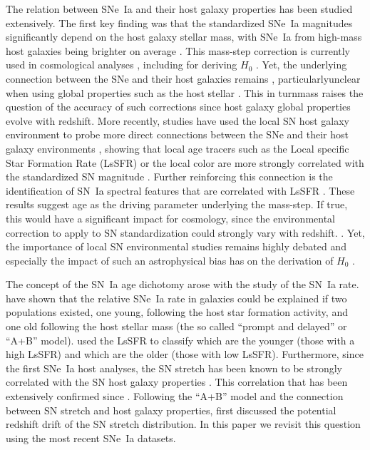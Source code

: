 \documentclass[]{aa}
\begin{document}
The relation between SNe~Ia and their host galaxy properties has been
studied extensively. The first key finding was that the standardized SNe~Ia
magnitudes significantly depend on the host galaxy stellar mass, with
SNe~Ia from high-mass host galaxies being brighter on average
\cite[e.g.][]{kelly2010, sullivan2010, childress2013, betoule2014, rigault2020,
kim19}. This mass-step correction is currently used in cosmological analyses
\citep[e.g.][]{betoule2014, scolnic2018a}, including for deriving $H_0$
\citep{riess2016, riess2019}. Yet, the underlying connection between the SNe and
their host galaxies remains , particularlyunclear when using
global properties such as the host stellar . This in turnmass raises
the question of the accuracy of such corrections since host galaxy
global properties evolve with redshift. More recently, studies have used the
local SN host galaxy environment to probe more direct connections
between the SNe and their host galaxy environments \citep{rigault2013},
showing that local age tracers such as the Local specific Star Formation Rate
(LsSFR) or the local color are more strongly correlated with the standardized SN
magnitude \citep{roman2018, kim18,rigault2020}. Further reinforcing this
connection is the identification of SN~Ia spectral features that are correlated
with LsSFR \citep{nordin2018}. These results suggest age as the driving
parameter underlying the mass-step. If true, this would have a significant
impact for cosmology, since the environmental correction to apply to SN
standardization could strongly vary with redshift. \citep{rigault2013,
childress2014, scolnic2018a}. Yet, the importance of local SN environmental
studies remains highly debated \cite[e.g.][]{jones2015, jones2019} and
especially the impact of such an astrophysical bias has on the derivation of
$H_0$ \citep{jones2015, riess2016, riess2018, rose2019}. 

The concept of the SN~Ia age dichotomy arose with the study of the SN~Ia rate.
\cite{mannucci2005, scannapieco2005, sullivan2006, aubourg2008} have shown that
the relative SNe~Ia rate in galaxies could be explained if two populations
existed, one young, following the host star formation activity, and one old
following the host stellar mass (the so called ``prompt and delayed'' or ``A+B''
model). \cite{rigault2020} used the LsSFR to classify which are the younger
(those with a high LsSFR) and which are the older (those with low LsSFR).
Furthermore, since the first SNe~Ia host analyses, the SN stretch has been known
to be strongly correlated with the SN host galaxy properties
\citep{hamuy1996, hamuy2000}. This correlation that has been extensively
confirmed since \citep[e.g.][]{neill2009, sullivan2010, lampeitl2010, kelly2010,
gupta2011, dandrea2011, childress2013, rigault2013, pan2014, kim19}. Following
the ``A+B'' model and the connection between SN stretch and host galaxy
properties, \cite{howell2007} first discussed the potential redshift drift of
the SN stretch distribution. In this paper we revisit this question
using the most recent SNe~Ia datasets.
\end{document}
